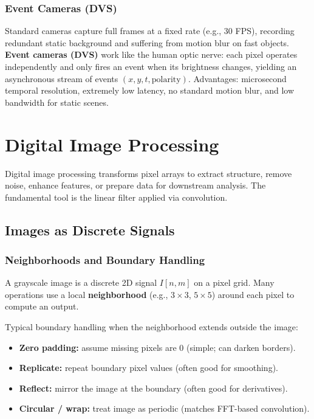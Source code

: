 \documentclass[11pt, oneside]{book}
\begin{document}
\begin{thmbox}[title={Reprojection Error Minimization}]
\subsection{Event Cameras (DVS)}

Standard cameras capture full frames at a fixed rate (e.g., 30 FPS), recording redundant static background
and suffering from motion blur on fast objects.
\textbf{Event cameras (DVS)} work like the human optic nerve: each pixel operates independently and only fires
an event when its brightness changes, yielding an asynchronous stream of events $(x,y,t,\text{polarity})$.
Advantages: microsecond temporal resolution, extremely low latency, no standard motion blur, and low bandwidth for static scenes.


\chapter{Digital Image Processing}

Digital image processing transforms pixel arrays to extract structure, remove noise, enhance features,
or prepare data for downstream analysis. The fundamental tool is the linear filter applied via convolution.

\section{Images as Discrete Signals}

\subsection{Neighborhoods and Boundary Handling}

\begin{defbox}[title={Discrete Image Signal}]
A grayscale image is a discrete 2D signal $I[n,m]$ on a pixel grid. Many operations use a local
\textbf{neighborhood} (e.g., $3\times 3$, $5\times 5$) around each pixel to compute an output.
\end{defbox}

Typical boundary handling when the neighborhood extends outside the image:
\begin{itemize}
  \item \textbf{Zero padding:} assume missing pixels are 0 (simple; can darken borders).
  \item \textbf{Replicate:} repeat boundary pixel values (often good for smoothing).
  \item \textbf{Reflect:} mirror the image at the boundary (often good for derivatives).
  \item \textbf{Circular / wrap:} treat image as periodic (matches FFT-based convolution).
\end{itemize}


\end{thmbox}
\end{document}
